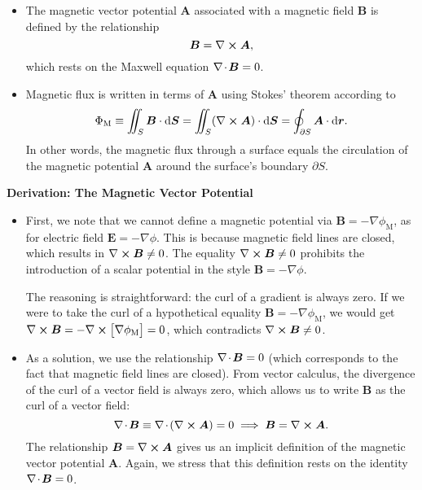 \documentclass[11pt, a4paper]{article}
\newcommand{\diff}{\mathop{}\!\mathrm{d}} %
\renewcommand{\vec}[1]{\bm{#1}} %
\renewcommand{\r}{\vec{r}}
\newcommand{\E}{\vec{E}} %
\newcommand{\B}{\vec{B}} %
\newcommand{\A}{\vec{A}} %
\renewcommand{\div}{\nabla \mspace{-2mu} \cdot \mspace{-2mu}}
\renewcommand{\curl}{\nabla \cross}
\renewcommand{\grad}{\nabla}
\begin{document}
\begin{itemize}
    \item The magnetic vector potential $ \A $ associated with a magnetic field $ \B $ is defined by the relationship
    \begin{equation*}
        \B = \curl \A,
    \end{equation*}
    which rests on the Maxwell equation $ \div \B = 0 $.
    
	\item Magnetic flux is written in terms of $ \A $ using Stokes' theorem according to
	\begin{equation*}
		\Phi_{\text{M}} \equiv \iint_{S}\B \cdot \diff \vec{S} = \iint_{S} (\curl \A) \cdot \diff \vec{S} = \oint_{\partial S} \A \cdot \diff \r.
	\end{equation*}
	In other words, the magnetic flux through a surface equals the circulation of the magnetic potential $ \A $ around the surface's boundary $ \partial S $.

\end{itemize}

\textbf{Derivation: The Magnetic Vector Potential}
\begin{itemize}
	
    \item First, we note that we cannot define a magnetic potential via $ \B = - \grad \phi_{\text{M}} $, as for electric field $ \E = - \grad \phi $. This is because magnetic field lines are closed, which results in $ \curl \B \neq 0 $. The equality $ \curl \B \neq 0 $ prohibits the introduction of a scalar potential in the style $ \B = - \grad \phi $.

    The reasoning is straightforward: the curl of a gradient is always zero. If we were to take the curl of a hypothetical equality $ \B = - \grad \phi_{\text{M}} $, we would get $ \curl \B = - \curl \big[ \grad \phi_{\text{M}} \big] = 0 $, which contradicts $ \curl \B \neq 0 $. 
	
	\item As a solution, we use the relationship $ \div \B = 0 $ (which corresponds to the fact that magnetic field lines are closed). From vector calculus, the divergence of the curl of a vector field is always zero, which allows us to write $ \B $ as the curl of a vector field:
	\begin{equation*}
		\div \B \equiv \div \left(\curl \A\right) = 0 \implies \B = \curl \A. 
	\end{equation*}
    The relationship $ \B = \curl \A $ gives us an implicit definition of the magnetic vector potential $ \A $. Again, we stress that this definition rests on the identity $ \div \B = 0 $. 
	
\end{itemize}
\end{document}
